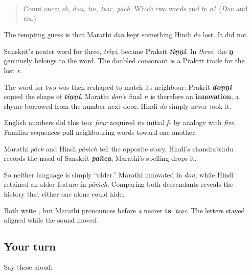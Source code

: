 \label{lesson:MR-C06-number-differences}



\begin{quote}
Count once: \emph{ek, don, tīn, tsār, pāch}. Which two words end in \emph{n}? (\emph{Don} and \emph{tīn}.)
\end{quote}

\begin{cousinweb}
The tempting guess is that Marathi \textbf{} \emph{don} kept something Hindi \textbf{} \emph{do} lost. It did not.

Sanskrit's neuter word for three, \textbf{} \emph{tr\'{\={\i}}ṇi}, became Prakrit \emph{\textbf{tiṇṇi}}. In \emph{three}, the \textbf{ṇ} genuinely belongs to the word. The doubled consonant is a Prakrit trade for the lost \emph{r}.

The word for two was then reshaped to match its neighbour: Prakrit \emph{\textbf{doṇṇi}} copied the shape of \emph{\textbf{tiṇṇi}}. Marathi \emph{don}'s final \emph{n} is therefore an \textbf{innovation}, a rhyme borrowed from the number next door. Hindi \emph{do} simply never took it.

English numbers did this too: \emph{four} acquired its initial \emph{f-} by analogy with \emph{five}. Familiar sequences pull neighbouring words toward one another.
\end{cousinweb}

\begin{grammarlens}[title={What you've built: \mr{पाच} and the nasal Hindi kept}]
Marathi \textbf{} \emph{pāch} and Hindi \textbf{} \emph{pāṁch} tell the opposite story. Hindi's chandrabindu \textbf{} records the nasal of Sanskrit \emph{\textbf{pañca}}; Marathi's spelling drops it.

So neither language is simply “older.” Marathi innovated in \emph{don}, while Hindi retained an older feature in \emph{pāṁch}. Comparing both descendants reveals the history that either one alone could hide.
\end{grammarlens}

\begin{sounds}
Both write \textbf{}, but Marathi pronounces \textbf{} before \emph{ā} nearer \textbf{ts}: \emph{tsār}. The letters stayed aligned while the sound moved.
\end{sounds}

\subsection*{Your turn}
Say these aloud:

